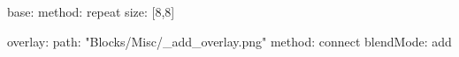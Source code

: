 base:
  method: repeat
  size: [8,8]

overlay:
  path: "Blocks/Misc/_add_overlay.png"
  method: connect
blendMode: add